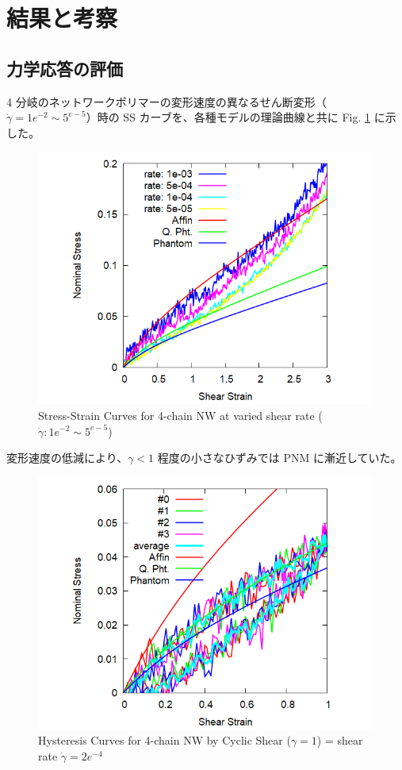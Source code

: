 \documentclass[uplatex,10pt,a4paper,twocolumn]{jsarticle}
\begin{document}
\section{結果と考察}

\subsection{力学応答の評価}
4 分岐のネットワークポリマーの変形速度の異なるせん断変形（$\dot{\gamma} = 1e^{-2} \sim 5^{e-5}$）時の SS カーブを、各種モデルの理論曲線と共に Fig. \ref{fig:deform} に示した。
\newpage

\begin{figure}[htb]
	\begin{center}
	\includegraphics[width=.42\textwidth]{Shear_Random_4chain_N20.png}
	\caption{Stress-Strain Curves for 4-chain NW at varied shear rate ($\dot{\gamma}: 1e^{-2} \sim 5^{e-5}$)}
	\label{fig:deform}
	\end{center}
\end{figure}
\vspace{-5mm}

変形速度の低減により、$\gamma<1$ 程度の小さなひずみでは PNM に漸近していた。


\vspace{-2mm}
\begin{figure}[htb]
	\begin{center}
	\includegraphics[width=.42\textwidth]{CyclicDeform_4chain_rate_2e-4.png}
	\caption{Hysteresis Curves for 4-chain NW by Cyclic Shear ($\gamma = 1$) = shear rate $\dot{\gamma} = 2e^{-4}$}
	\label{fig:hyst}
	\end{center}
\end{figure}
\vspace{-5mm}
\end{document}
